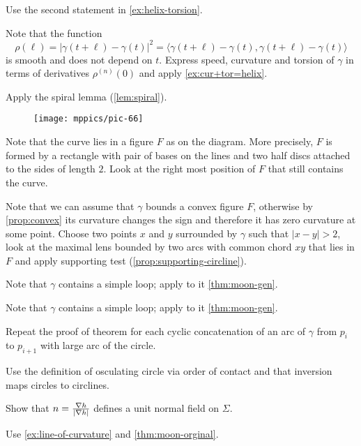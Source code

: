  Use the second statement in \ref{ex:helix-torsion}.

 Note that the function
\[\rho(\ell)=|\gamma(t+\ell)-\gamma(t)|^2=\langle \gamma(t+\ell)-\gamma(t),\gamma(t+\ell)-\gamma(t)\rangle\] 
is smooth and does not depend on $t$.
Express speed, curvature and torsion of $\gamma$ in terms of derivatives $\rho^{(n)}(0)$
and apply \ref{ex:cur+tor=helix}.

 Apply the spiral lemma (\ref{lem:spiral}).

\begin{wrapfigure}{r}{35 mm}
\vskip1mm
\centering
\texttt{[image: mppics/pic-66]}
\vskip0mm
\end{wrapfigure}

 Note that the curve lies in a figure $F$ as on the diagram.
More precisely, $F$ is formed by a rectangle with pair of bases on the lines and two half discs attached to the sides of length $2$.
Look at the right most position of $F$ that still contains the curve.

Note that we can assume that $\gamma$ bounds a convex figure $F$, otherwise by \ref{prop:convex} its curvature changes the sign and therefore it has zero curvature at some point.
Choose two points $x$ and $y$ surrounded by $\gamma$ such that $|x-y|>2$,
look at the maximal lens bounded by two arcs with common chord $xy$ that lies in $F$ and apply supporting test (\ref{prop:supporting-circline}).

 Note that $\gamma$ contains a simple loop; apply to it \ref{thm:moon-gen}.

 Note that $\gamma$ contains a simple loop; apply to it \ref{thm:moon-gen}.

Repeat the proof of theorem for each cyclic concatenation of an arc of $\gamma$ from $p_i$ to $p_{i+1}$ with large arc of the circle. 

 Use the definition of osculating circle via order of contact and that inversion maps circles to circlines. 

 Show that $n=\tfrac{\nabla h}{|\nabla h|}$ defines a unit normal field on $\Sigma$.

 Use \ref{ex:line-of-curvature} and \ref{thm:moon-orginal}.

